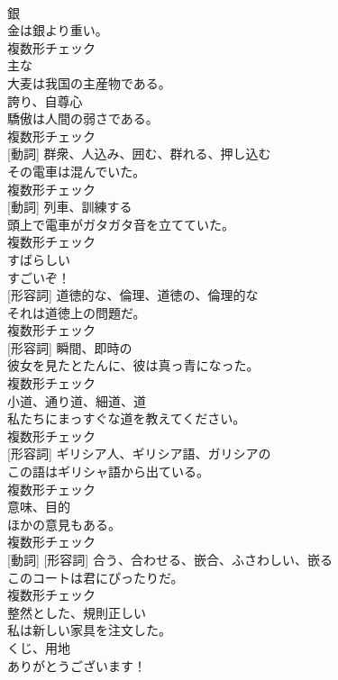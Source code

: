 \documentclass[8pt]{extreport}
\begin{document}
\begin{CJK}{UTF8}{min}
\\	[名詞]	銀	
\\	金は銀より重い。	
\\	複数形チェック
\\	[形容詞]	主な	
\\	大麦は我国の主産物である。	
\\	[名詞]	誇り、自尊心	
\\	驕傲は人間の弱さである。	
\\	複数形チェック
\\	[名詞] [動詞]	群衆、人込み、囲む、群れる、押し込む	
\\	その電車は混んでいた。	
\\	複数形チェック
\\	[名詞] [動詞]	列車、訓練する	
\\	頭上で電車がガタガタ音を立てていた。	
\\	複数形チェック
\\	[形容詞]	すばらしい	
\\	すごいぞ！	
\\	[名詞] [形容詞]	道徳的な、倫理、道徳の、倫理的な	
\\	それは道徳上の問題だ。	
\\	複数形チェック
\\	[名詞] [形容詞]	瞬間、即時の	
\\	彼女を見たとたんに、彼は真っ青になった。	
\\	複数形チェック
\\	[名詞]	小道、通り道、細道、道	
\\	私たちにまっすぐな道を教えてください。	
\\	複数形チェック
\\	[名詞] [形容詞]	ギリシア人、ギリシア語、ガリシアの	
\\	この語はギリシャ語から出ている。	
\\	複数形チェック
\\	[名詞]	意味、目的	
\\	ほかの意見もある。	
\\	複数形チェック
\\	[名詞] [動詞] [形容詞]	合う、合わせる、嵌合、ふさわしい、嵌る	
\\	このコートは君にぴったりだ。	
\\	複数形チェック
\\	[形容詞]	整然とした、規則正しい	
\\	私は新しい家具を注文した。	
\\	[名詞]	くじ、用地	
\\	ありがとうございます！	

\end{CJK}
\end{document}
